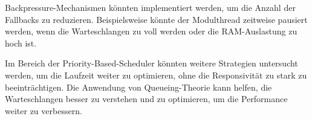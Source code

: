 \begin{sloppypar}
\noindent Backpressure-Mechanismen könnten implementiert werden, um die Anzahl der Fallbacks zu reduzieren. 
Beispielsweise könnte der Modulthread zeitweise pausiert werden, wenn die Warteschlangen zu voll werden oder die \acs{RAM}-Auslastung zu hoch ist.

\vspace{7.56mm}

\noindent Im Bereich der Priority-Based-Scheduler könnten weitere Strategien untersucht werden, um die Laufzeit weiter zu optimieren, ohne die Responsivität zu stark zu beeinträchtigen.
Die Anwendung von Queueing-Theorie kann helfen, die Warteschlangen besser zu verstehen und zu optimieren, um die Performance weiter zu verbessern.

\end{sloppypar}